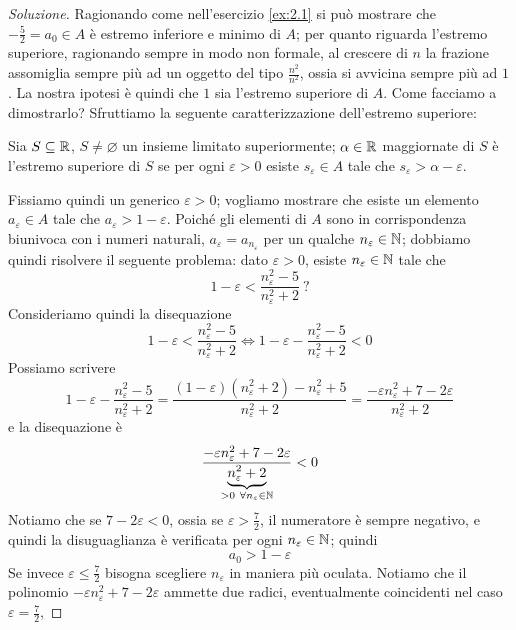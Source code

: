 \begin{proof}[Soluzione]
    Ragionando come nell'esercizio \ref{ex:2.1} si può mostrare che $-\frac{5}{2} = a_0\in A$ è estremo inferiore e minimo di $A$; per quanto riguarda l'estremo superiore, ragionando sempre in modo non formale, al crescere di $n$ la frazione assomiglia sempre più ad un oggetto del tipo $\frac{n^2}{n^2}$, ossia si avvicina sempre più ad $1$. La nostra ipotesi è quindi che $1$ sia l'estremo superiore di $A$. Come facciamo a dimostrarlo? Sfruttiamo la seguente caratterizzazione dell'estremo superiore:
    \begin{tcolorbox}
        \begin{theorem}
            \label{th:2.2}
            Sia $S\subseteq \amsbb{R}$, $S\ne \varnothing$ un insieme limitato superiormente; $\alpha\in \amsbb{R}$ maggiornate di $S$ è l'estremo superiore di $S$ se per ogni $\varepsilon>0$ esiste $s_{\varepsilon}\in A$ tale che $s_\varepsilon>\alpha-\varepsilon$.
        \end{theorem}
    \end{tcolorbox}
    Fissiamo quindi un generico $\varepsilon>0$; vogliamo mostrare che esiste un elemento $a_\varepsilon\in A$ tale che $a_\varepsilon>1-\varepsilon$. Poiché gli elementi di $A$ sono in corrispondenza biunivoca con i numeri naturali, $a_\varepsilon = a_{n_\varepsilon}$ per un qualche $n_\varepsilon \in \amsbb{N}$; dobbiamo quindi risolvere il seguente problema: dato $\varepsilon>0$, esiste $n_\varepsilon\in\amsbb{N}$ tale che
    \[
    1-\varepsilon<\frac{n_\varepsilon^2-5}{n_\varepsilon^2+2} \ \text{?}
    \]
    Consideriamo quindi la disequazione
    \[
    1-\varepsilon < \frac{n_\varepsilon^2-5}{n_\varepsilon^2+2} \iff 1-\varepsilon - \frac{n_\varepsilon^2-5}{n_\varepsilon^2+2} <0
    \]
    Possiamo scrivere
    \[
    1-\varepsilon-\frac{n_\varepsilon^2-5}{n_\varepsilon^2+2} = \frac{(1-\varepsilon)(n_\varepsilon^2+2)-n_\varepsilon^2+5}{n_\varepsilon^2+2} = \frac{-\varepsilon n_\varepsilon^2+7-2\varepsilon}{n_\varepsilon^2+2}
    \]
    e la disequazione è
    \[
    \frac{-\varepsilon n_\varepsilon^2 + 7 -2\varepsilon}{\underbrace{n_\varepsilon^2+2}_{>0 \ \forall n_\varepsilon \in \amsbb{N}}}<0
    \]
    Notiamo che se $7-2\varepsilon<0$, ossia se $\varepsilon>\frac{7}{2}$, il numeratore è sempre negativo, e quindi la disuguaglianza è verificata per ogni $n_\varepsilon\in\amsbb{N}$; quindi
    \[
    a_0> 1-\varepsilon
    \]
    Se invece $\varepsilon\le\frac{7}{2}$ bisogna scegliere $n_\varepsilon$ in maniera più oculata. Notiamo che il polinomio $-\varepsilon n_\varepsilon^2 +7-2\varepsilon$ ammette due radici, eventualmente coincidenti nel caso $\varepsilon=\frac{7}{2}$,

\end{proof}

